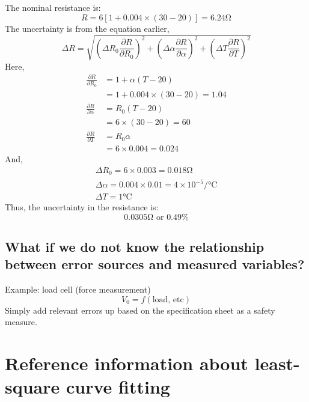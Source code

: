 The nominal resistance is:
\begin{equation}
  R = 6 [1 + 0.004 \times (30 -20)] = 6.24 \si{\ohm}
\end{equation}
The uncertainty is from the equation earlier,
\begin{equation}
  \Delta R = \sqrt{\left(\Delta R_0 \frac{\partial R}{\partial R_0}\right)^2 + \left(\Delta \alpha \frac{\partial R}{\partial \alpha}\right)^2 + \left(\Delta T\frac{\partial R}{\partial T}\right)^2}
\end{equation}
Here,
\begin{align}
  \frac{\partial R}{\partial R_0}    & = 1 + \alpha (T-20)                \\
                                     & = 1 + 0.004 \times (30 -20) = 1.04 \\
  \frac{\partial R}{\partial \alpha} & = R_0 (T-20)                       \\
                                     & = 6 \times (30-20) = 60            \\
  \frac{\partial R}{\partial T}      & = R_0 \alpha                       \\
                                     & = 6 \times 0.004 = 0.024
\end{align}
And,
\begin{gather}
  \Delta R_0 = 6 \times 0.003 = 0.018 \si{\ohm}\\
  \Delta \alpha = 0.004 \times 0.01 = 4 \times 10^{-5} \si{\per\celsius}\\
  \Delta T = 1 \si{\celsius}
\end{gather}
Thus, the uncertainty in the resistance is:
\begin{equation}
  0.0305 \si{\ohm} \textrm{ or } 0.49 \%
\end{equation}
\subsection{What if we do not know the relationship between error sources and measured variables?}
Example: load cell (force measurement)
\begin{equation}
  V_0 = f(\textrm{load, etc})
\end{equation}
Simply add relevant errors up based on the specification sheet as a safety measure.
\section{Reference information about least-square curve fitting}
